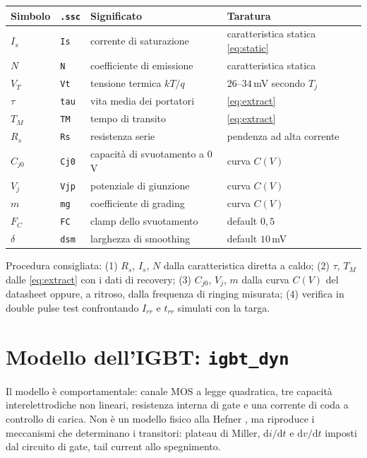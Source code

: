 \documentclass[11pt,a4paper]{article}
\newcommand{\ud}{\mathrm{d}}
\newcommand{\ssc}[1]{\texttt{#1}}
\begin{document}
\begin{center}
\begin{tabular}{llll}
\hline
Simbolo & \ssc{.ssc} & Significato & Taratura \\
\hline
$I_s$   & \ssc{Is}  & corrente di saturazione & caratteristica statica \eqref{eq:static} \\
$N$     & \ssc{N}   & coefficiente di emissione & caratteristica statica \\
$V_T$   & \ssc{Vt}  & tensione termica $kT/q$ & $26$--$34\,$mV secondo $T_j$ \\
$\tau$  & \ssc{tau} & vita media dei portatori & \eqref{eq:extract} \\
$T_M$   & \ssc{TM}  & tempo di transito & \eqref{eq:extract} \\
$R_s$   & \ssc{Rs}  & resistenza serie & pendenza ad alta corrente \\
$C_{j0}$& \ssc{Cj0} & capacit\`a di svuotamento a $0\,$V & curva $C(V)$ \\
$V_j$   & \ssc{Vjp} & potenziale di giunzione & curva $C(V)$ \\
$m$     & \ssc{mg}  & coefficiente di grading & curva $C(V)$ \\
$F_C$   & \ssc{FC}  & clamp dello svuotamento & default $0{,}5$ \\
$\delta$& \ssc{dsm} & larghezza di smoothing & default $10\,$mV \\
\hline
\end{tabular}
\end{center}

Procedura consigliata: (1) $R_s$, $I_s$, $N$ dalla caratteristica
diretta a caldo; (2) $\tau$, $T_M$ dalle \eqref{eq:extract} con i dati
di recovery; (3) $C_{j0}$, $V_j$, $m$ dalla curva $C(V)$ del datasheet
oppure, a ritroso, dalla frequenza di ringing misurata; (4) verifica in
double pulse test confrontando $I_{rr}$ e $t_{rr}$ simulati con la
targa.

\section{Modello dell'IGBT: \ssc{igbt\_dyn}}

Il modello \`e comportamentale: canale MOS a legge quadratica, tre
capacit\`a interelettrodiche non lineari, resistenza interna di gate e
una corrente di coda a controllo di carica. Non \`e un modello fisico
alla Hefner \cite{hefner1994}, ma riproduce i meccanismi che determinano
i transitori: plateau di Miller, $\ud i/\ud t$ e $\ud v/\ud t$ imposti
dal circuito di gate, tail current allo spegnimento.
\end{document}
